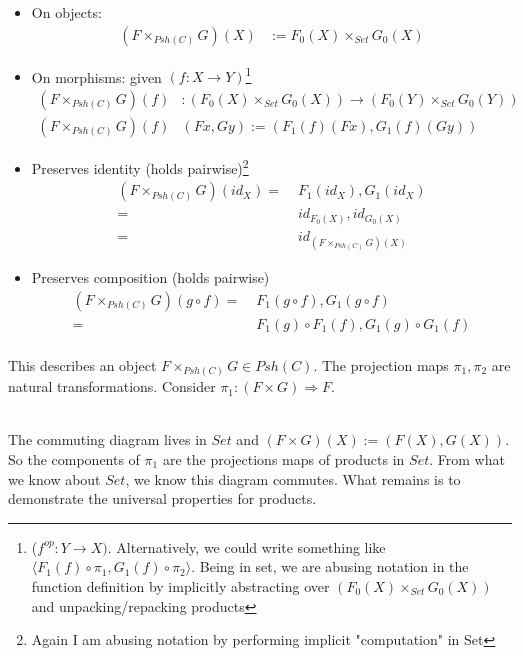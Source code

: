 \documentclass{article}
\begin{document}
    \begin{itemize}
        \item[] On objects:
            \begin{align*}
                (F \times_{Psh(C)} G) (X) &:= F_0 (X) \times_{Set} G_0 (X) 
            \end{align*}
        \item[] On morphisms: given $(f : X \rightarrow Y)$\footnote{($f^{op} : Y \rightarrow X)$. Alternatively, we could write something like $\langle F_1 (f) \circ \pi_1, G_1 (f) \circ \pi_2 \rangle$. Being in set, we are abusing notation in the function definition by implicitly abstracting over $(F_0 (X) \times_{Set} G_0 (X))$ and unpacking/repacking products }
        \begin{align*}
            (F \times_{Psh(C)} G)(f)&: (F_0 (X) \times_{Set} G_0 (X)) \rightarrow (F_0 (Y) \times_{Set} G_0 (Y)) \\
            (F \times_{Psh(C)} G)(f)&(Fx ,Gy) := (F_1(f)(Fx) , G_1(f)(Gy))
        \end{align*} 
        
    
        \item[] Preserves identity (holds pairwise)\footnote{Again I am abusing notation by performing implicit "computation" in Set}
        \begin{align*}
            (F \times_{Psh(C)} G)(id_X) =&\; F_1 (id_X) , G_1 (id_X)\\
            =&\; id_{F_0(X)}, id_{G_0(X)}\\
            =&\; id_{(F \times_{Psh(C)} G)(X)}
        \end{align*}
        \item[] Preserves composition (holds pairwise)
        \begin{align*}
            (F \times_{Psh(C)} G)(g \circ f) =&\; F_1 (g \circ f) , G_1 (g \circ f)\\
            =&\; F_1(g) \circ F_1(f), G_1(g) \circ G_1(f)\\
        \end{align*}
    \end{itemize}
    \newpage
This describes an object $F \times_{Psh(C)} G \in Psh(C)$. The projection maps $\pi_1, \pi_2$ are natural transformations. Consider $\pi_1 : (F \times G) \Rightarrow F$.
\begin{figure}[!h]
\centering
\end{figure}\\
The commuting diagram lives in $Set$ and $(F \times G)(X) := (F(X), G(X))$. So the components of $\pi_1$ are the projections maps of products in $Set$. From what we know about $Set$, we know this diagram commutes. What remains is to demonstrate the universal properties for products.
\end{document}
